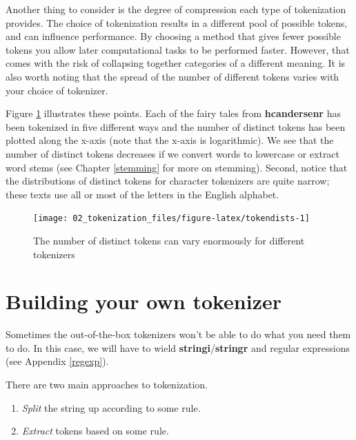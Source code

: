 \documentclass[
]{krantz}
\providecommand{\tightlist}{%
  \setlength{\itemsep}{0pt}\setlength{\parskip}{0pt}}
\begin{document}
Another thing to consider is the degree of compression each type of tokenization provides. The choice of tokenization results in a different pool of possible tokens, and can influence performance. By choosing a method that gives fewer possible tokens you allow later computational tasks to be performed faster. However, that comes with the risk of collapsing together categories of a different meaning. It is also worth noting that the spread of the number of different tokens varies with your choice of tokenizer.

Figure \ref{fig:tokendists} illustrates these points. Each of the fairy tales from \textbf{hcandersenr} has been tokenized in five different ways and the number of distinct tokens has been plotted along the x-axis (note that the x-axis is logarithmic). We see that the number of distinct tokens decreases if we convert words to lowercase or extract word stems (see Chapter \ref{stemming} for more on stemming). Second, notice that the distributions of distinct tokens for character tokenizers are quite narrow; these texts use all or most of the letters in the English alphabet.

\begin{figure}

{\centering \texttt{[image: 02\_tokenization\_files/figure-latex/tokendists-1]} 

}

\caption{The number of distinct tokens can vary enormously for different tokenizers}\label{fig:tokendists}
\end{figure}

\hypertarget{building-your-own-tokenizer}{%
\section{Building your own tokenizer}\label{building-your-own-tokenizer}}

Sometimes the out-of-the-box tokenizers won't be able to do what you need them to do. In this case, we will have to wield \textbf{stringi}/\textbf{stringr} and regular expressions (see Appendix \ref{regexp}).

There are two main approaches to tokenization.

\begin{enumerate}
\def\labelenumi{\arabic{enumi}.}
\tightlist
\item
  \emph{Split} the string up according to some rule.
\item
  \emph{Extract} tokens based on some rule.
\end{enumerate}
\end{document}
